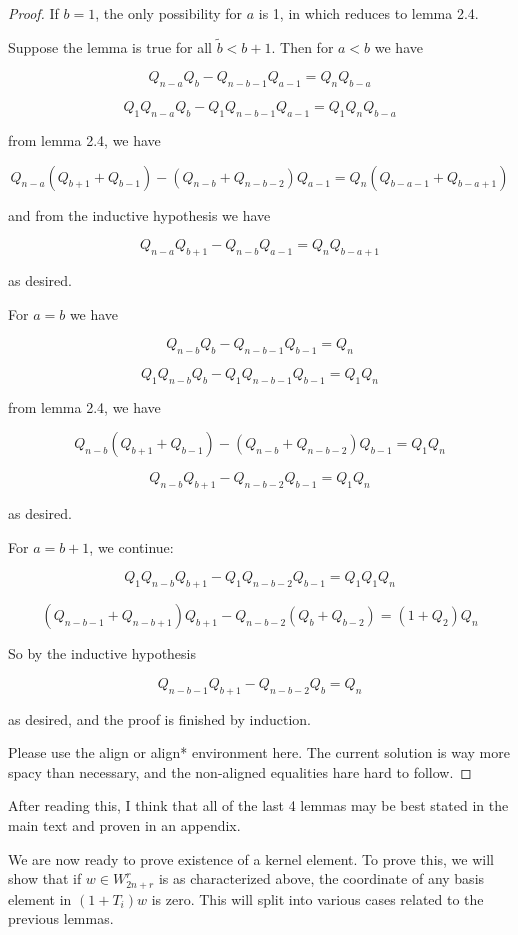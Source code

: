 \documentclass{amsart}
\begin{document}
\begin{proof}
	If $b=1$, the only possibility for $a$ is 1, in which reduces to lemma 2.4.
	
	Suppose the lemma is true for all $\tilde{b}<b+1$. Then for $a< b$ we have 
	
	$$Q_{n-a}Q_b -Q_{n-b-1}Q_{a-1}=Q_{n}Q_{b-a}$$
	
	$$Q_1Q_{n-a}Q_b-Q_1Q_{n-b-1}Q_{a-1}=Q_1Q_{n}Q_{b-a}$$
	
	from lemma 2.4, we have
	
	$$Q_{n-a}(Q_{b+1}+Q_{b-1})-(Q_{n-b}+Q_{n-b-2})Q_{a-1}=Q_{n}(Q_{b-a-1}+Q_{b-a+1})$$
	
	and from the inductive hypothesis we have
	
	$$Q_{n-a}Q_{b+1}-Q_{n-b}Q_{a-1}=Q_{n}Q_{b-a+1}$$
	
	as desired.
	
	For $a=b$ we have 
	
	$$Q_{n-b}Q_b -Q_{n-b-1}Q_{b-1}=Q_{n}$$
	
	$$Q_1Q_{n-b}Q_b-Q_1Q_{n-b-1}Q_{b-1}=Q_1Q_{n}$$
	
	from lemma 2.4, we have
	
	$$Q_{n-b}(Q_{b+1}+Q_{b-1})-(Q_{n-b}+Q_{n-b-2})Q_{b-1}=Q_1Q_{n}$$
	
	$$Q_{n-b}Q_{b+1}-Q_{n-b-2}Q_{b-1}=Q_1Q_{n}$$
	
	as desired.
	
	For $a=b+1$, we continue:
	
	$$Q_1Q_{n-b}Q_{b+1}-Q_1Q_{n-b-2}Q_{b-1}=Q_1Q_1Q_{n}$$
	
	$$(Q_{n-b-1}+Q_{n-b+1})Q_{b+1}-Q_{n-b-2}(Q_{b}+Q_{b-2})=(1+Q_2)Q_{n}$$
	
	So by the inductive hypothesis
	
	$$Q_{n-b-1}Q_{b+1}-Q_{n-b-2}Q_{b}=Q_{n}$$
	
	as desired, and the proof is finished by induction.
  
  {\color{magenta} Please use the align or align* environment here. The current solution is way more spacy than necessary, and the non-aligned equalities hare hard to follow.}
\end{proof}

{\color{magenta} After reading this, I think that all of the last 4 lemmas may be best stated in the main text and proven in an appendix.}

\vspace{5mm}
We are now ready to prove existence of a kernel element. To prove this, we will show that if $w\in W_{2n+r}^r$ is as characterized above, the coordinate of any basis element in $(1+T_i)w$ is zero. This will split into various cases related to the previous lemmas.
\end{document}
